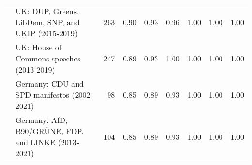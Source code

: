 \begin{table}[!t]
\begin{tabular}[t]{llrrrrrrr}
\hspace{1em} & UK: DUP, Greens, LibDem, SNP, and UKIP (2015-2019) & 263 & 0.90 & 0.93 & 0.96 & 1.00 & 1.00 & 1.00\\

\hspace{1em} & UK: House of Commons speeches (2013-2019) & 247 & 0.89 & 0.93 & 1.00 & 1.00 & 1.00 & 1.00\\

\hspace{1em} & Germany: CDU and SPD manifestos (2002-2021) & 98 & 0.85 & 0.89 & 0.93 & 1.00 & 1.00 & 1.00\\

\hspace{1em} & Germany: AfD, B90/GRÜNE, FDP, and LINKE (2013-2021) & 104 & 0.85 & 0.89 & 0.93 & 1.00 & 1.00 & 1.00\\
\bottomrule
\end{tabular}
\end{table}
